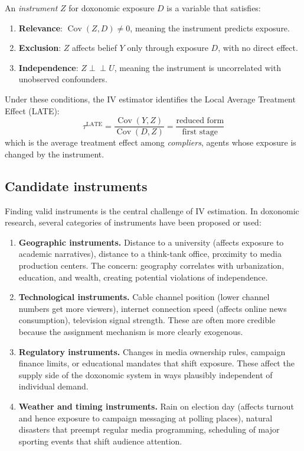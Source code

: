 \begin{definition}
\label{def:instrument}
An \emph{instrument} $Z$ for doxonomic exposure $D$ is a variable that satisfies:
\begin{enumerate}[nosep]
  \item \textbf{Relevance}: $\operatorname{Cov}(Z, D) \neq 0$, meaning the instrument predicts exposure.
  \item \textbf{Exclusion}: $Z$ affects belief $Y$ only through exposure $D$, with no direct effect.
  \item \textbf{Independence}: $Z \perp\!\!\!\perp U$, meaning the instrument is uncorrelated with unobserved confounders.
\end{enumerate}
Under these conditions, the IV estimator identifies the Local Average Treatment Effect (LATE):
\[
  \tau^{\text{LATE}} = \frac{\operatorname{Cov}(Y, Z)}{\operatorname{Cov}(D, Z)} = \frac{\text{reduced form}}{\text{first stage}}
\]
which is the average treatment effect among \emph{compliers}, agents whose exposure is changed by the instrument.
\end{definition}

\subsection{Candidate instruments}

Finding valid instruments is the central challenge of IV estimation.
In doxonomic research, several categories of instruments have been proposed or used:

\begin{enumerate}
  \item \textbf{Geographic instruments.}
  Distance to a university (affects exposure to academic narratives), distance to a think-tank office, proximity to media production centers.
  The concern: geography correlates with urbanization, education, and wealth, creating potential violations of independence.

  \item \textbf{Technological instruments.}
  Cable channel position (lower channel numbers get more viewers), internet connection speed (affects online news consumption), television signal strength.
  These are often more credible because the assignment mechanism is more clearly exogenous.

  \item \textbf{Regulatory instruments.}
  Changes in media ownership rules, campaign finance limits, or educational mandates that shift exposure.
  These affect the supply side of the doxonomic system in ways plausibly independent of individual demand.

  \item \textbf{Weather and timing instruments.}
  Rain on election day (affects turnout and hence exposure to campaign messaging at polling places), natural disasters that preempt regular media programming, scheduling of major sporting events that shift audience attention.
\end{enumerate}

